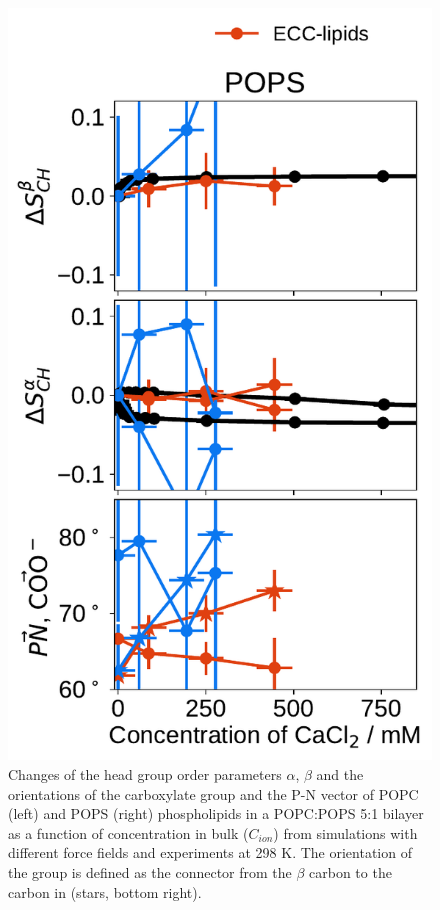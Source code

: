 \begin{figure}[tbp!]
  \includegraphics[width=\figwidthsmall]{../img/ecc_pops/order_parameters_changes_ecc-lip_L14_A-B-PN-COO_POPS_cacl.pdf} 
  \caption{\label{fig:delta_ordPar_CaCl_PCPS} 
    Changes of the head group order parameters $\alpha$, $\beta$ and the orientations of the carboxylate group and the P-N vector  
    of POPC (left) and POPS (right) phospholipids in a POPC:POPS 5:1 bilayer as a function of  concentration 
    in bulk ($C_{ion}$) from simulations with different force fields and experiments at 298 K. \citep{roux90}
    The orientation of the  group is defined as 
    the connector from the $\beta$ carbon to the carbon in  (stars, bottom right). 
  } 
\end{figure} 



